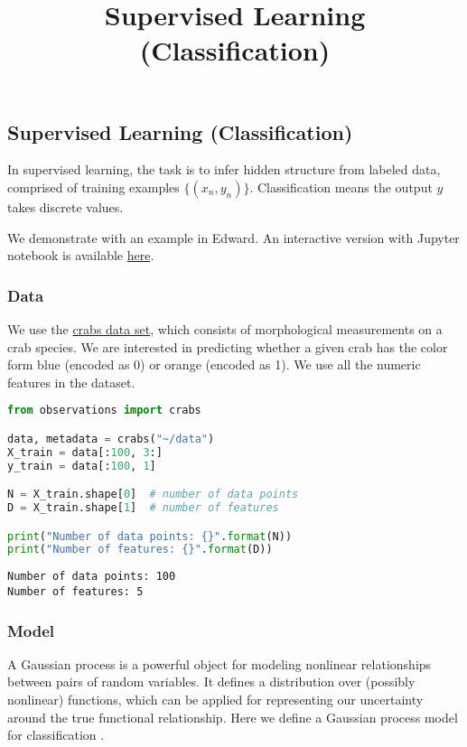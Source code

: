 \title{Supervised Learning (Classification)}

\subsection{Supervised Learning (Classification)}

In supervised learning, the task is to infer hidden structure from
labeled data, comprised of training examples $\{(x_n, y_n)\}$.
Classification means the output $y$ takes discrete values.

We demonstrate with an example in Edward.
An interactive version with Jupyter notebook is available
\href{http://nbviewer.jupyter.org/github/blei-lab/edward/blob/master/notebooks/supervised_classification.ipynb}{here}.

\subsubsection{Data}

We use the
\href{https://stat.ethz.ch/R-manual/R-devel/library/MASS/html/crabs.html}
{crabs data set},
which consists of morphological measurements on a crab species. We
are interested in predicting whether a given crab has the color form
blue (encoded as 0) or orange (encoded as 1). We use all the numeric features
in the dataset.
\begin{lstlisting}[language=Python]
from observations import crabs

data, metadata = crabs("~/data")
X_train = data[:100, 3:]
y_train = data[:100, 1]

N = X_train.shape[0]  # number of data points
D = X_train.shape[1]  # number of features

print("Number of data points: {}".format(N))
print("Number of features: {}".format(D))
\end{lstlisting}

\begin{lstlisting}
Number of data points: 100
Number of features: 5
\end{lstlisting}

\subsubsection{Model}

A Gaussian process is a powerful object for modeling nonlinear
relationships between pairs of random variables. It defines a distribution over
(possibly nonlinear) functions, which can be applied for representing
our uncertainty around the true functional relationship.
Here we define a Gaussian process model for classification
\citep{rasmussen2006gaussian}.

